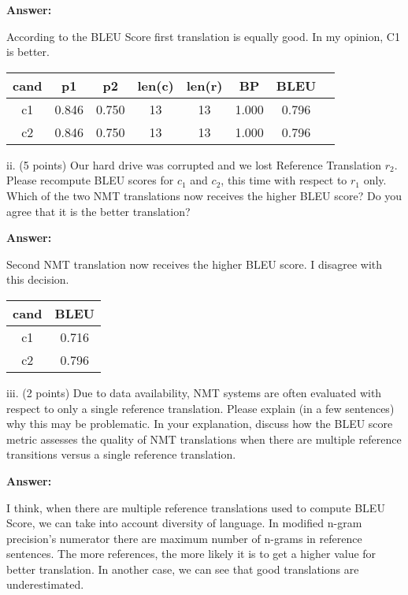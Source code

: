 \documentclass{article}
\begin{document}
	
	\smallbreak
	\textbf{Answer:}
	
	According to the BLEU Score first translation is equally good. In my opinion, C1 
	is better.

	\begin{center}
	\begin{tabular}{ |c|c|c|c|c|c|c|c| } 
		\hline
		cand & p1 & p2 & len(c) & len(r) & BP & BLEU \\
		\hline
	    c1 & 0.846 & 0.750 & 13 & 13 & 1.000 & 0.796\\ 
		c2 & 0.846 & 0.750 & 13 & 13 & 1.000 & 0.796\\ 
		\hline
	\end{tabular}
	\end{center}

	
	
	ii. (5 points) Our hard drive was corrupted and we lost Reference Translation $r_2$. Please recompute BLEU scores for $c_1$ and $c_2$, this time with respect to $r_1$ only. Which of the two NMT translations now receives the higher BLEU score? Do you agree that it is the better translation?
	
	\smallbreak
	\textbf{Answer:}
	
	Second NMT translation now receives the higher BLEU score. I disagree with this decision.
	
	\begin{center}
		\begin{tabular}{ |c|c| } 
			\hline
			cand & BLEU \\
			\hline
			c1 & 0.716\\ 
			c2 & 0.796\\ 
			\hline
		\end{tabular}
	\end{center}
	
	iii. (2 points) Due to data availability, NMT systems are often evaluated with respect to only a single reference translation. Please explain (in a few sentences) why this may be problematic. In your explanation, discuss how the BLEU score metric assesses the quality of NMT translations when there are multiple reference transitions versus a single reference translation.
	
	\smallbreak
	\textbf{Answer:}
	
	I think, when there are multiple reference translations used to compute BLEU Score, we can take into account diversity of language. In modified n-gram precision’s numerator there are maximum number of n-grams in reference sentences. The more references, the more likely it is to get a higher value for better translation. In another case, we can see that good translations are underestimated.
	
\end{document}
